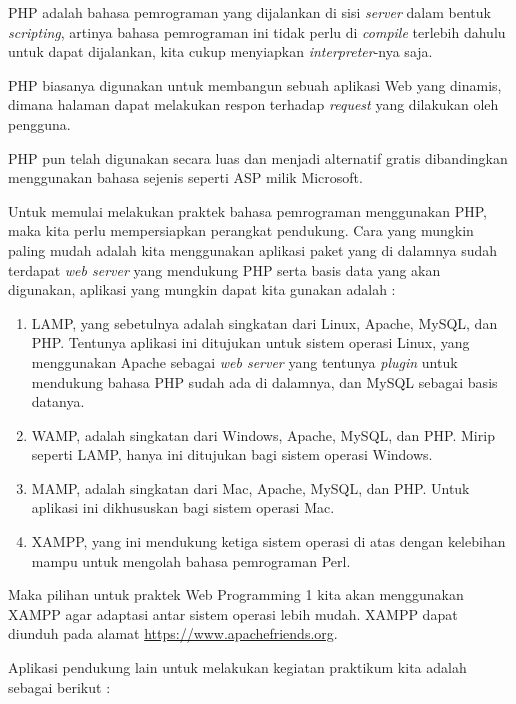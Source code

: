 PHP adalah bahasa pemrograman yang dijalankan di sisi \textit{server} dalam bentuk \textit{scripting}, artinya bahasa pemrograman ini tidak perlu di \textit{compile} terlebih dahulu untuk dapat dijalankan, kita cukup menyiapkan \textit{interpreter}-nya saja.

PHP biasanya digunakan untuk membangun sebuah aplikasi Web yang dinamis, dimana halaman dapat melakukan respon terhadap \textit{request} yang dilakukan oleh pengguna. 

PHP pun telah digunakan secara luas dan menjadi alternatif gratis dibandingkan menggunakan bahasa sejenis seperti ASP milik Microsoft.

Untuk memulai melakukan praktek bahasa pemrograman menggunakan PHP, maka kita perlu mempersiapkan perangkat pendukung. Cara yang mungkin paling mudah adalah kita menggunakan aplikasi paket yang di dalamnya sudah terdapat \textit{web server} yang mendukung PHP serta basis data yang akan digunakan, aplikasi yang mungkin dapat kita gunakan adalah :

\begin{enumerate}
	\item LAMP, yang sebetulnya adalah singkatan dari Linux, Apache, MySQL, dan PHP. Tentunya aplikasi ini ditujukan untuk sistem operasi Linux, yang menggunakan Apache sebagai \textit{web server} yang tentunya \textit{plugin} untuk mendukung bahasa PHP sudah ada di dalamnya, dan MySQL sebagai basis datanya.
	\item WAMP, adalah singkatan dari Windows, Apache, MySQL, dan PHP. Mirip seperti LAMP, hanya ini ditujukan bagi sistem operasi Windows.
	\item MAMP, adalah singkatan dari Mac, Apache, MySQL, dan PHP. Untuk aplikasi ini dikhususkan bagi sistem operasi Mac.
	\item XAMPP, yang ini mendukung ketiga sistem operasi di atas dengan kelebihan mampu untuk mengolah bahasa pemrograman Perl.
\end{enumerate}

Maka pilihan untuk praktek Web Programming 1 kita akan menggunakan XAMPP agar adaptasi antar sistem operasi lebih mudah. XAMPP dapat diunduh pada alamat \url{https://www.apachefriends.org}.

Aplikasi pendukung lain untuk melakukan kegiatan praktikum kita adalah sebagai berikut :

